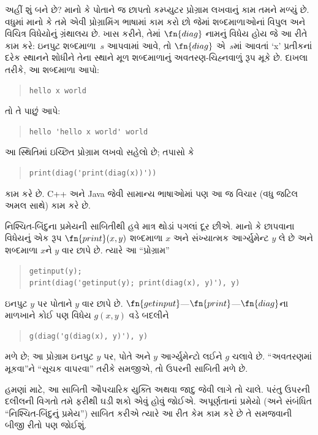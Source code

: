 \documentclass[../../../include/open-logic-section]{subfiles}
\begin{document}
\begin{explain}
અહીં શું બને છે? માનો કે પોતાને જ છાપતો કમ્પ્યુટર પ્રોગ્રામ
લખવાનું કામ તમને મળ્યું છે. વધુમાં માનો કે તમે એવી
પ્રોગ્રામિંગ ભાષામાં કામ કરો છો જેમાં શબ્દમાળાઓનાં વિપુલ
અને વિચિત્ર વિધેયોનું ગ્રંથાલય છે. ખાસ કરીને, તેમાં
$\fn{diag}$ નામનું વિધેય હોય જે આ રીતે કામ કરે:
ઇનપુટ શબ્દમાળા~$s$ આપવામાં આવે, તો $\fn{diag}$ એ~$s$માં
આવતાં `x' પ્રતીકનાં દરેક સ્થાનને શોધીને તેના સ્થાને
મૂળ શબ્દમાળાનું અવતરણ-ચિહ્નવાળું
રૂપ મૂકે છે. દાખલા તરીકે, આ શબ્દમાળા આપો:
\begin{quote}
\begin{verbatim}
hello x world
\end{verbatim}
\end{quote}
તો તે પાછું આપે:
\begin{quote}
\begin{verbatim}
hello 'hello x world' world
\end{verbatim}
\end{quote}
આ સ્થિતિમાં ઇચ્છિત પ્રોગ્રામ લખવો સહેલો છે; તપાસો કે
\begin{quote}
\begin{verbatim}
print(diag('print(diag(x))'))
\end{verbatim}
\end{quote}
કામ કરે છે. C++ અને Java જેવી સામાન્ય ભાષાઓમાં પણ
આ જ વિચાર (વધુ જટિલ અમલ સાથે) કામ કરે છે.

નિશ્ચિત-બિંદુના પ્રમેયની સાબિતીથી હવે માત્ર થોડાં પગલાં
દૂર છીએ. માનો કે છાપવાના વિધેયનું એક રૂપ
$\fn{print}(x,y)$ શબ્દમાળા $x$ અને સંખ્યાત્મક આર્ગ્યુમેન્ટ
$y$ લે છે અને શબ્દમાળા $x$ને $y$ વાર છાપે છે. ત્યારે આ
``પ્રોગ્રામ''
\begin{quote}
\begin{verbatim}
getinput(y);
print(diag('getinput(y); print(diag(x), y)'), y)
\end{verbatim}
\end{quote}
ઇનપુટ $y$ પર પોતાને $y$ વાર છાપે છે.
$\fn{getinput}$---$\fn{print}$---$\fn{diag}$ના માળખાને
કોઈ પણ વિધેય $g(x,y)$ વડે બદલીને
\begin{quote}
\begin{verbatim}
g(diag('g(diag(x), y)'), y)
\end{verbatim}
\end{quote}
મળે છે; આ પ્રોગ્રામ ઇનપુટ $y$ પર, પોતે અને $y$
આર્ગ્યુમેન્ટો લઈને $g$ ચલાવે છે. ``અવતરણમાં મૂકવા''ને
``સૂચક વાપરવા'' તરીકે સમજીએ, તો ઉપરની સાબિતી મળે છે.

હમણાં માટે, આ સાબિતી ઔપચારિક યુક્તિ અથવા જાદુ જેવી
લાગે તો ચાલે. પરંતુ ઉપરની દલીલની વિગતો તમે ફરીથી
ઘડી શકો એવું હોવું જોઈએ. અપૂર્ણતાનાં પ્રમેયો (અને
સંબંધિત ``નિશ્ચિત-બિંદુનું પ્રમેય'') સાબિત કરીએ ત્યારે
આ રીત કેમ કામ કરે છે તે સમજવાની બીજી રીતો પણ જોઈશું.
\end{explain}
\end{document}
